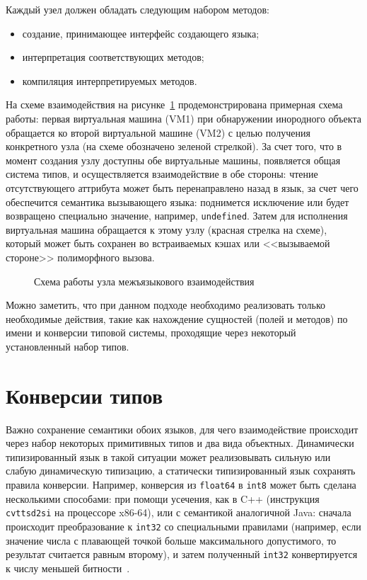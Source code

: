 \documentclass[times
]{itmo-student-thesis}
\begin{document}
Каждый узел должен обладать следующим набором методов:
\begin{itemize}
	\item создание, принимающее интерфейс создающего языка;
	\item интерпретация соответствующих методов;
	\item компиляция интерпретируемых методов.
\end{itemize}
На схеме взаимодействия на рисунке~\ref{fig:create-interop-node} продемонстрирована примерная схема работы: первая виртуальная машина (VM1) при обнаружении инородного объекта обращается ко второй виртуальной машине (VM2) с целью получения конкретного узла (на схеме обозначено зеленой стрелкой). За счет того, что в момент создания узлу доступны обе виртуальные машины, появляется общая система типов, и осуществляется взаимодействие в обе стороны: чтение отсутствующего аттрибута может быть перенаправлено назад в язык, за счет чего обеспечится семантика вызывающего языка: поднимется исключение или будет возвращено специально значение, например, \texttt{undefined}. Затем для исполнения виртуальная машина обращается к этому узлу (красная стрелка на схеме), который может быть сохранен во встраиваемых кэшах или <<вызываемой стороне>> полиморфного вызова.
\begin{figure}[!h]
	\caption{Схема работы узла межъязыкового взаимодействия}\label{fig:create-interop-node}
	\centering
	
\end{figure}

Можно заметить, что при данном подходе необходимо реализовать только необходимые действия, такие как нахождение сущностей (полей и методов) по имени и конверсии типовой системы, проходящие через некоторый установленный набор типов.

\section{Конверсии типов}
Важно сохранение семантики обоих языков, для чего взаимодействие происходит через набор некоторых примитивных типов и два вида объектных. Динамически типизированный язык в такой ситуации может реализовывать сильную или слабую динамическую типизацию, а статически типизированный язык сохранять правила конверсии. Например, конверсия из \texttt{float64} в \texttt{int8} может быть сделана несколькими способами: при помощи усечения, как в C++ (инструкция \texttt{cvttsd2si} на процессоре x86-64), или с семантикой аналогичной Java: сначала происходит преобразование к \texttt{int32} со специальными правилами (например, если значение числа с плавающей точкой больше максимального допустимого, то результат считается равным второму), и затем полученный \texttt{int32} конвертируется к числу меньшей битности~\cite{java8-spec}.
\end{document}
